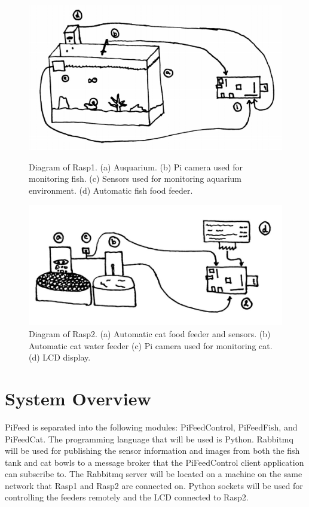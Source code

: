 \begin{figure}[H]
    \centering
    \begin{minipage}[b]{0.45\linewidth}
        \centering
        \captionsetup{justification=centering, margin = 0.5cm}
        \includegraphics[scale=0.3]{images/FishTank} 
        \caption{Diagram of Rasp1. (a) Auquarium. (b) Pi camera used for
        monitoring fish. (c) Sensors used for monitoring aquarium environment.
        (d) Automatic fish food feeder.}
        \label{fig:highFood}
    \end{minipage}
    \quad
    \begin{minipage}[b]{0.45\linewidth}
        \centering
        \captionsetup{justification=centering, margin = 0.5cm}
        \includegraphics[scale=0.4]{images/Cat} 
        \caption{Diagram of Rasp2. (a) Automatic cat food feeder and sensors.
        (b) Automatic cat water feeder (c) Pi camera used for monitoring cat.
        (d) LCD display.}
        \label{fig:highCat}
    \end{minipage}
\end{figure}

\section{System Overview}
PiFeed is separated into the following modules: PiFeedControl, PiFeedFish, and
PiFeedCat. The programming language that will be used is Python. Rabbitmq will
be used for publishing the sensor information and images from both the fish tank
and cat bowls to a message broker that the PiFeedControl client application can
subscribe to. The Rabbitmq server will be located on a machine on the same
network that Rasp1 and Rasp2 are connected on. Python sockets will be used for
controlling the feeders remotely and the LCD connected to Rasp2.

